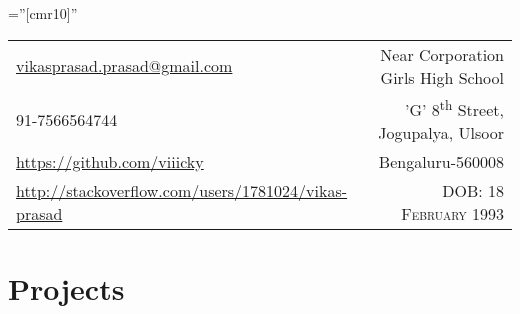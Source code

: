 \documentclass[a4paper,10pt]{article} %
\begin{document}
\pagestyle{empty} %

\font\fb=''[cmr10]'' %


\par{\par} %

\begin{tabular}{lr}
\href{mailto:vikasprasad.prasad@gmail.com}{vikasprasad.prasad@gmail.com} & Near Corporation Girls High School \\
91-7566564744 & 'G' 8\textsuperscript{th} Street, Jogupalya, Ulsoor \\
\href{https://github.com/viiicky}{https://github.com/viiicky} & Bengaluru-560008 \\
\href{http://stackoverflow.com/users/1781024/vikas-prasad}{http://stackoverflow.com/users/1781024/vikas-prasad} &  \textsc{DOB:} \textsc{18 February 1993} \\
\end{tabular}


\section{Projects}
\end{document}
